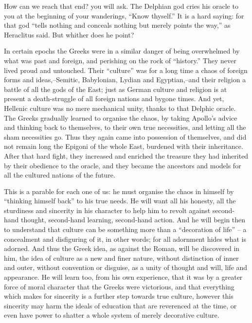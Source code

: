 How can we reach that end? you will ask. The Delphian god cries his
oracle to you at the beginning of your wanderings, \enquote{Know thyself.} It
is a hard saying: for that god \enquote{tells nothing and conceals nothing
but merely points the way,} as Heraclitus said. But whither does he
point?

In certain epochs the Greeks were in a similar danger of being
overwhelmed by what was past and foreign, and perishing on the rock
of \enquote{history.} They never lived proud and untouched. Their \enquote{culture}
was for a long time a chaos of foreign forms and ideas,--Semitic,
Babylonian, Lydian and Egyptian,--and their religion a battle of all
the gods of the East; just as German culture and religion is at
present a death-struggle of all foreign nations and bygone times. And
yet, Hellenic culture was no mere mechanical unity, thanks to that
Delphic oracle. The Greeks gradually learned to organise the chaos,
by taking Apollo's advice and thinking back to themselves, to their
own true necessities, and letting all the sham necessities go. Thus
they again came into possession of themselves, and did not remain
long the Epigoni of the whole East, burdened with their inheritance.
After that hard fight, they increased and enriched the treasure they
had inherited by their obedience to the oracle, and they became the
ancestors and models for all the cultured nations of the future.

This is a parable for each one of us: he must organise the chaos in
himself by \enquote{thinking himself back} to his true needs. He will want
all his honesty, all the sturdiness and sincerity in his character to
help him to revolt against second-hand thought, second-hand learning,
second-hand action. And he will begin then to understand that culture
can be something more than a \enquote{decoration of life} -- a concealment and
disfiguring of it, in other words; for all adornment hides what is
adorned. And thus the Greek idea, as against the Roman, will be
discovered in him, the idea of culture as a new and finer nature,
without distinction of inner and outer, without convention or
disguise, as a unity of thought and will, life and appearance. He
will learn too, from his own experience, that it was by a greater
force of moral character that the Greeks were victorious, and that
everything which makes for sincerity is a further step towards true
culture, however this sincerity may harm the ideals of education that
are reverenced at the time, or even have power to shatter a whole
system of merely decorative culture.


